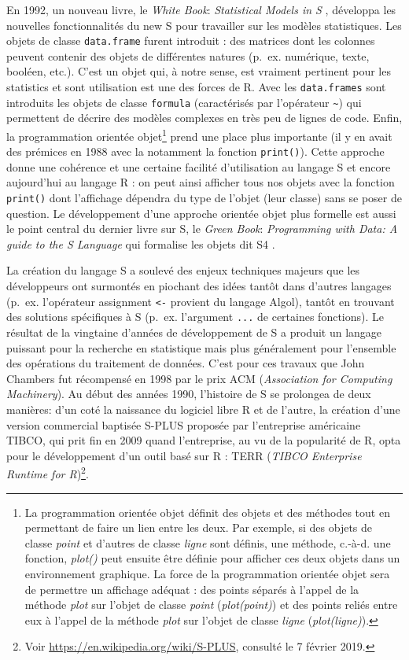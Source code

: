 \documentclass[]{article}
\begin{document}
En 1992, un nouveau livre, le \emph{White Book}: \emph{Statistical Models in S} \citep{chambers_statistical_1993}, développa les nouvelles fonctionnalités du new S pour travailler sur les modèles statistiques. Les objets de classe \texttt{data.frame} furent introduit : des matrices dont les colonnes peuvent contenir des objets de différentes natures (p.~ex. numérique, texte, booléen, etc.). C'est un objet qui, à notre sense, est vraiment pertinent pour les statistics et sont utilisation est une des forces de R. Avec les \texttt{data.frames} sont introduits les objets de classe \texttt{formula} (caractérisés par l'opérateur \texttt{\textasciitilde{}}) qui permettent de décrire des modèles complexes en très peu de lignes de code. Enfin, la programmation orientée objet\footnote{La programmation orientée objet définit des objets et des méthodes tout en permettant de faire un lien entre les deux. Par exemple, si des objets de classe \emph{point} et d'autres de classe \emph{ligne} sont définis, une méthode, c.-à-d. une fonction, \emph{plot()} peut ensuite être définie pour afficher ces deux objets dans un environnement graphique. La force de la programmation orientée objet sera de permettre un affichage adéquat : des points séparés à l'appel de la méthode \emph{plot} sur l'objet de classe \emph{point} (\emph{plot(point)}) et des points reliés entre eux à l'appel de la méthode \emph{plot} sur l'objet de classe \emph{ligne} (\emph{plot(ligne)}).} prend une place plus importante (il y en avait des prémices en 1988 avec la notamment la fonction \texttt{print()}). Cette approche donne une cohérence et une certaine facilité d'utilisation au langage S et encore aujourd'hui au langage R : on peut ainsi afficher tous nos objets avec la fonction \texttt{print()} dont l'affichage dépendra du type de l'objet (leur classe) sans se poser de question. Le développement d'une approche orientée objet plus formelle est aussi le point central du dernier livre sur S, le \emph{Green Book}: \emph{Programming with Data: A guide to the S Language} qui formalise les objets dit S4 \citep{chambers_programming_1998}.

La création du langage S a soulevé des enjeux techniques majeurs que les développeurs ont surmontés en piochant des idées tantôt dans d'autres langages (p.~ex. l'opérateur assignment \texttt{\textless{}-} provient du langage Algol), tantôt en trouvant des solutions spécifiques à S (p.~ex. l'argument \texttt{...} de certaines fonctions). Le résultat de la vingtaine d'années de développement de S a produit un langage puissant pour la recherche en statistique mais plus généralement pour l'ensemble des opérations du traitement de données. C'est pour ces travaux que John Chambers fut récompensé en 1998 par le prix ACM (\emph{Association for Computing Machinery}). Au début des années 1990, l'histoire de S se prolongea de deux manières: d'un coté la naissance du logiciel libre R et de l'autre, la création d'une version commercial baptisée S-PLUS proposée par l'entreprise américaine TIBCO, qui prit fin en 2009 quand l'entreprise, au vu de la popularité de R, opta pour le développement d'un outil basé sur R : TERR (\emph{TIBCO Enterprise Runtime for R})\footnote{Voir \url{https://en.wikipedia.org/wiki/S-PLUS}, consulté le 7 février 2019.}.
\end{document}
